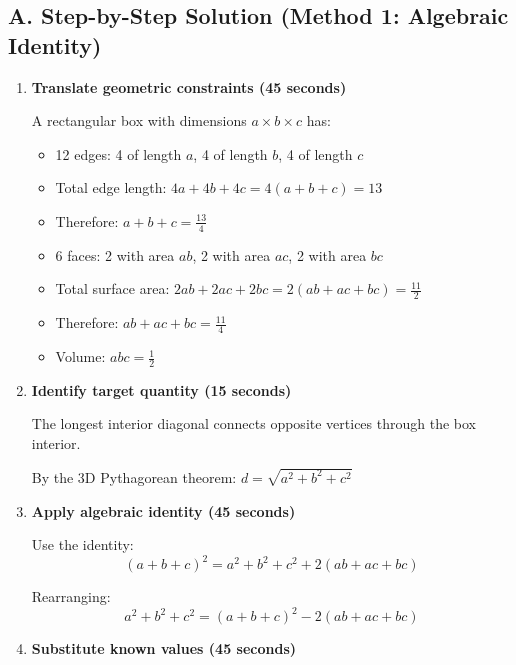 \documentclass[12pt]{article}
\begin{document}
\begin{solutionbox}
\subsection*{A. Step-by-Step Solution (Method 1: Algebraic Identity)}
\begin{enumerate}[leftmargin=*]
    \item \textbf{Translate geometric constraints (45 seconds)}
    
    A rectangular box with dimensions $a \times b \times c$ has:
    \begin{itemize}
        \item 12 edges: 4 of length $a$, 4 of length $b$, 4 of length $c$
        \item Total edge length: $4a + 4b + 4c = 4(a+b+c) = 13$
        \item Therefore: $a+b+c = \frac{13}{4}$
    \end{itemize}
    
    \begin{itemize}
        \item 6 faces: 2 with area $ab$, 2 with area $ac$, 2 with area $bc$
        \item Total surface area: $2ab + 2ac + 2bc = 2(ab+ac+bc) = \frac{11}{2}$
        \item Therefore: $ab+ac+bc = \frac{11}{4}$
    \end{itemize}
    
    \begin{itemize}
        \item Volume: $abc = \frac{1}{2}$
    \end{itemize}
    
    \item \textbf{Identify target quantity (15 seconds)}
    
    The longest interior diagonal connects opposite vertices through the box interior.
    
    By the 3D Pythagorean theorem: $d = \sqrt{a^2 + b^2 + c^2}$
    
    \item \textbf{Apply algebraic identity (45 seconds)}
    
    Use the identity:
    $$(a+b+c)^2 = a^2 + b^2 + c^2 + 2(ab + ac + bc)$$
    
    Rearranging:
    $$a^2 + b^2 + c^2 = (a+b+c)^2 - 2(ab + ac + bc)$$
    
    \item \textbf{Substitute known values (45 seconds)}
    

\end{enumerate}
\end{solutionbox}
\end{document}
